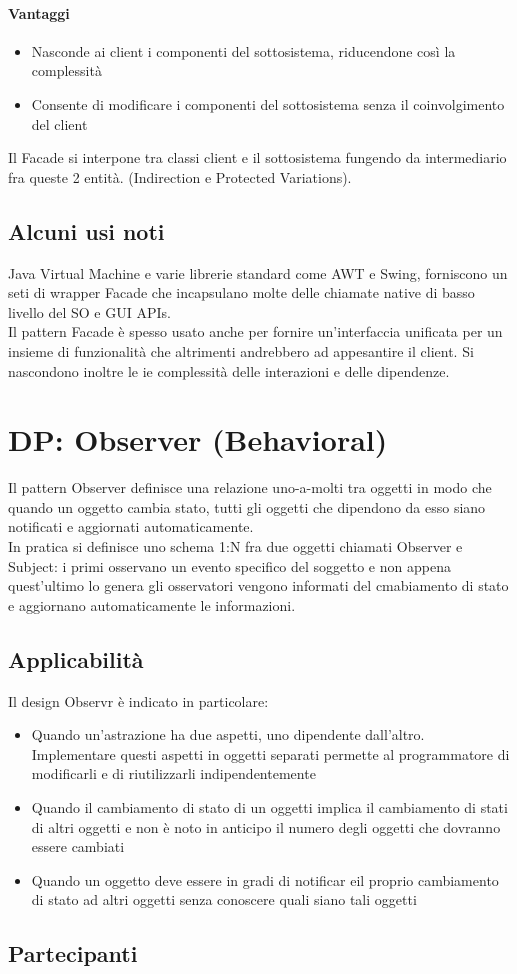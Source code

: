 \paragraph*{Vantaggi}
\begin{itemize}
    \item Nasconde ai client i componenti del sottosistema, riducendone così la complessità
    \item Consente di modificare i componenti del sottosistema senza il coinvolgimento del client
\end{itemize}
Il Facade si interpone tra classi client e il sottosistema fungendo da intermediario fra queste 2 entità.
(Indirection e Protected Variations).
\subsection*{Alcuni usi noti}
Java Virtual Machine e varie librerie standard come AWT e Swing, forniscono un seti di
wrapper Facade che incapsulano molte delle chiamate native di basso livello del SO e GUI APIs. \\
Il pattern Facade è spesso usato anche per fornire un'interfaccia unificata per un insieme di funzionalità
che altrimenti andrebbero ad appesantire il client. Si nascondono inoltre le ie complessità delle
interazioni e delle dipendenze.
\section{DP: Observer (Behavioral)}
Il pattern Observer definisce una relazione uno-a-molti tra oggetti in modo che quando un oggetto
cambia stato, tutti gli oggetti che dipendono da esso siano notificati e aggiornati automaticamente.\\
In pratica si definisce uno schema 1:N fra due oggetti chiamati Observer e Subject: i primi
osservano un evento specifico del soggetto e non appena quest'ultimo lo genera gli osservatori
vengono informati del cmabiamento di stato e aggiornano automaticamente le informazioni.
\subsection*{Applicabilità}
Il design Observr è indicato in particolare:
\begin{itemize}
    \item Quando un'astrazione ha due aspetti, uno dipendente dall'altro. Implementare questi
    aspetti in oggetti separati permette al programmatore di modificarli e di riutilizzarli
    indipendentemente
    \item Quando il cambiamento di stato di un oggetti implica il cambiamento di stati di altri oggetti
    e non è noto in anticipo il numero degli oggetti che dovranno essere cambiati
    \item Quando un oggetto deve essere in gradi di notificar eil proprio cambiamento di stato
    ad altri oggetti senza conoscere quali siano tali oggetti
\end{itemize}
\subsection*{Partecipanti}
